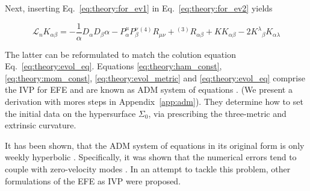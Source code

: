 Next, inserting Eq.~\eqref{eq:theory:for_ev1} in Eq.~\eqref{eq:theory:for_ev2} yields

\begin{equation}
    \mathcal{L}_n K_{\alpha\beta} = -\frac{1}{\alpha} D_{\alpha} D_{\beta} \alpha - P^{\mu}_{\alpha}P_{\beta}^{\nu} {^{(4)}R_{\mu\nu}} + {^{(3)}R_{\alpha\beta}} + KK_{\alpha\beta} - 2{K^{\lambda}}_{\beta}K_{\alpha\lambda}
\end{equation}

The latter can be reformulated to match the colution equation Eq.~\eqref{eq:theory:evol_eq}.
%
Equations \eqref{eq:theory:ham_const},\eqref{eq:theory:mom_const}, \eqref{eq:theory:evol_metric} and 
\eqref{eq:theory:evol_eq} comprise the  \ac{IVP} for \ac{EFE} and are known as \ac{ADM} 
system of equations \cite{Arnowitt:1962hi}.
(We present a derivation with mores steps in Appendix~\ref{app:adm}).
%
They determine how to set the initial 
data on the hypersurface $\Sigma_0$, via prescribing the three-metric and extrinsic curvature. 


It has been shown, that the \ac{ADM} system of equations in its original form 
is only weekly hyperbolic \citep{Baumgarte:2002jm}. Specifically, it was shown that the numerical 
errors tend to couple with zero-velocity modes \citep{Alcubierre:1999rt}. 
In an attempt to tackle this problem, other formulations of the \ac{EFE} as \ac{IVP} were proposed. 
%


